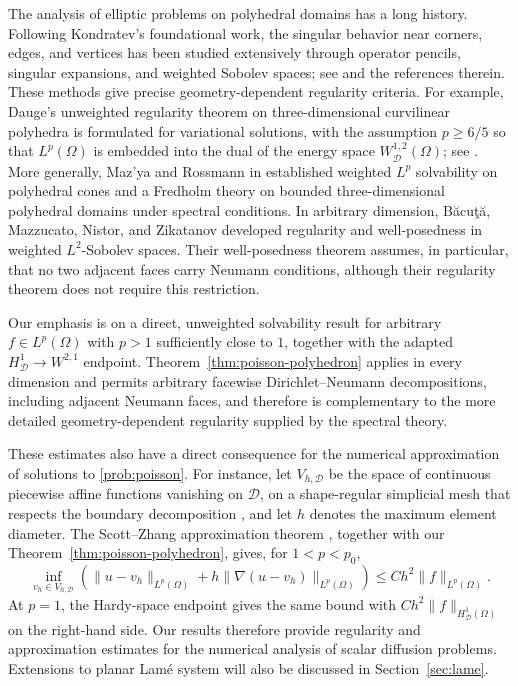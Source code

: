 \documentclass[12pt]{amsart}
\numberwithin{equation}{section}
\newcommand\cD{\mathcal{D}}
\begin{document}
The analysis of elliptic problems on polyhedral domains has a long history. Following Kondrat\textquotesingle ev's foundational work, the singular behavior near corners, edges, and vertices has been studied extensively through operator pencils, singular expansions, and weighted Sobolev spaces; see
\cite{Kondratiev1967,MR3396210,MR1147281,MazyaRossmann2003, MazyaRossmann2010, BacutaMazzucatoNistorZikatanov2010} and the references therein. 
These methods give precise geometry-dependent regularity criteria. For example, Dauge's unweighted regularity theorem on three-dimensional curvilinear polyhedra is formulated for variational solutions, with the assumption $p\geq6/5$ so that $L^p(\Omega)$ is embedded into the dual of the energy space $W^{1,2}_\cD(\Omega)$; see \cite[(3.1) and Theorem~3.2]{MR1147281}.
More generally, Maz'ya and Rossmann in \cite[Theorems~4.4 and~7.2]{MazyaRossmann2003} established weighted $L^p$ solvability on polyhedral cones and a Fredholm theory  on bounded three-dimensional polyhedral domains under spectral conditions.
In arbitrary dimension, B\u{a}cu\c{t}\u{a}, Mazzucato, Nistor, and Zikatanov \cite{BacutaMazzucatoNistorZikatanov2010} developed regularity and well-posedness in weighted $L^2$-Sobolev spaces. Their well-posedness theorem assumes, in particular, that no two adjacent faces carry Neumann conditions, although their regularity theorem does not require this restriction.

Our emphasis is on a direct, unweighted solvability result for arbitrary $f\in L^p(\Omega)$ with $p>1$ sufficiently close to $1$, together with the adapted $H^1_{\cD}\to W^{2,1}$ endpoint.
Theorem~\ref{thm:poisson-polyhedron} applies in every dimension and permits arbitrary facewise Dirichlet--Neumann decompositions, including adjacent Neumann faces, and therefore is complementary to the more detailed geometry-dependent regularity supplied by the spectral theory.



These estimates also have a direct consequence for the numerical approximation of solutions to \eqref{prob:poisson}. For instance, let $V_{h,\cD}$ be the space of continuous piecewise affine functions vanishing on $\cD$, on a shape-regular simplicial mesh that respects the boundary decomposition \cite{MR1930132}, and let $h$ denotes the maximum element diameter. The Scott--Zhang approximation theorem \cite[Theorem~4.1]{ScottZhang1990}, together with our Theorem~\ref{thm:poisson-polyhedron}, gives, for $1<p<p_0$,
$$
 \inf_{v_h\in V_{h,\cD}}
 \left(
  \|u-v_h\|_{L^p(\Omega)}
  +h\|\nabla(u-v_h)\|_{L^p(\Omega)}
 \right)
 \leq Ch^2\|f\|_{L^p(\Omega)}.
$$
At $p=1$, the Hardy-space endpoint gives the same bound with $Ch^2\|f\|_{H^1_{\cD}(\Omega)}$ on the right-hand side. 
Our results therefore provide regularity and approximation estimates for the numerical analysis of scalar diffusion problems. Extensions to planar Lam\'e system will also be discussed in Section~\ref{sec:lame}.
\end{document}
